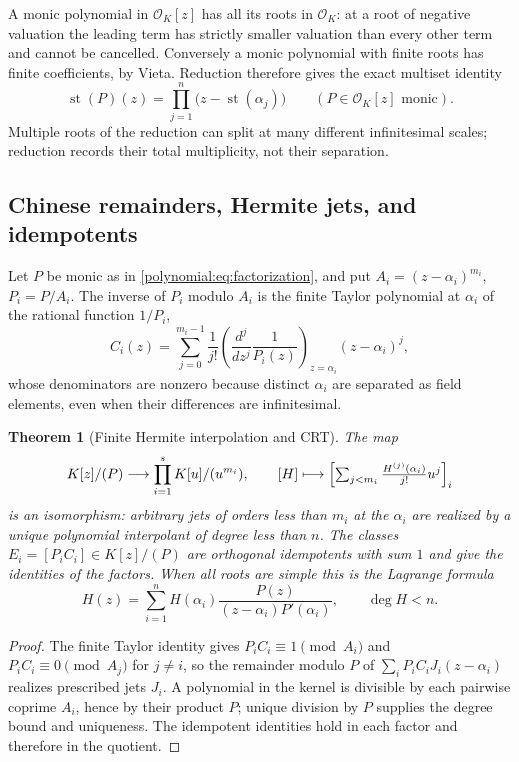 \documentclass[11pt,letterpaper]{article}
\numberwithin{equation}{section}
\newtheorem{theorem}{Theorem}[section]
\theoremstyle{definition}
\theoremstyle{remark}\newtheorem{remark}[theorem]{Remark}
\newcommand{\OO}{\mathcal O}
\newcommand{\st}{\operatorname{st}}
\begin{document}
A monic polynomial in $\OO_K[z]$ has all its roots in $\OO_K$: at a root of
negative valuation the leading term has strictly smaller valuation than every
other term and cannot be cancelled. Conversely a monic polynomial with finite
roots has finite coefficients, by Vieta. Reduction therefore gives the exact
multiset identity
\begin{equation}\label{polynomial:eq:reductionfactor}
 \st(P)(z)=\prod_{j=1}^n\bigl(z-\st(\alpha_j)\bigr)
 \qquad(P\in\OO_K[z]\text{ monic}).
\end{equation}
Multiple roots of the reduction can split at many different infinitesimal
scales; reduction records their total multiplicity, not their separation.

\subsection{Chinese remainders, Hermite jets, and idempotents}
Let $P$ be monic as in \eqref{polynomial:eq:factorization}, and put
$A_i=(z-\alpha_i)^{m_i}$, $P_i=P/A_i$. The inverse of $P_i$ modulo $A_i$ is
the finite Taylor polynomial at $\alpha_i$ of the rational function $1/P_i$,
\begin{equation}\label{polynomial:eq:inversejet}
 C_i(z)=\sum_{j=0}^{m_i-1}\frac1{j!}
 \left(\frac{d^j}{dz^j}\frac1{P_i(z)}\right)_{z=\alpha_i}(z-\alpha_i)^j ,
\end{equation}
whose denominators are nonzero because distinct $\alpha_i$ are separated as
field elements, even when their differences are infinitesimal.

\begin{theorem}[Finite Hermite interpolation and CRT]\label{polynomial:thm:crt}
The map
\begin{equation}\label{polynomial:eq:finiteCRT}
 K[z]/(P)\longrightarrow\prod_{i=1}^sK[u]/(u^{m_i}),
 \qquad [H]\longmapsto\Bigl[\textstyle\sum_{j<m_i}\frac{H^{(j)}(\alpha_i)}{j!}u^j\Bigr]_i
\end{equation}
is an isomorphism: arbitrary jets of orders less than $m_i$ at the $\alpha_i$
are realized by a unique polynomial interpolant of degree less than $n$. The
classes $E_i=[P_iC_i]\in K[z]/(P)$ are orthogonal idempotents with sum $1$ and
give the identities of the factors. When all roots are simple this is the
Lagrange formula
\begin{equation}\label{polynomial:eq:lagrange}
 H(z)=\sum_{i=1}^nH(\alpha_i)\frac{P(z)}{(z-\alpha_i)P'(\alpha_i)},
 \qquad\deg H<n .
\end{equation}
\end{theorem}
\begin{proof}
The finite Taylor identity gives $P_iC_i\equiv1\pmod{A_i}$ and
$P_iC_i\equiv0\pmod{A_j}$ for $j\ne i$, so the remainder modulo $P$ of
$\sum_iP_i C_i J_i(z-\alpha_i)$ realizes prescribed jets $J_i$. A polynomial
in the kernel is divisible by each pairwise coprime $A_i$, hence by their
product $P$; unique division by $P$ supplies the degree bound and uniqueness.
The idempotent identities hold in each factor and therefore in the quotient.
\end{proof}
\end{document}
